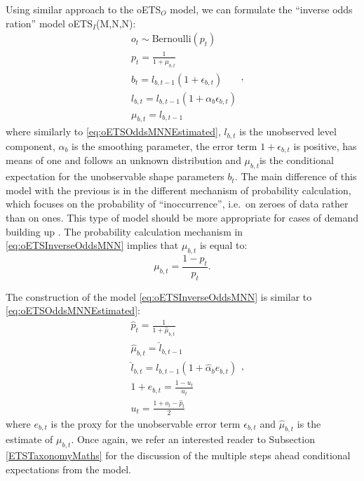 \documentclass[
]{book}
\theoremstyle{definition}
\theoremstyle{definition}
\theoremstyle{definition}
\theoremstyle{definition}
\theoremstyle{remark}
\begin{document}
Using similar approach to the oETS\(_O\) model, we can formulate the ``inverse odds ration'' model oETS\(_I\)(M,N,N):
\begin{equation}
    \begin{aligned}
        & o_t \sim \text{Bernoulli} \left(p_t \right) \\
        & p_t = \frac{1}{1+\mu_{b,t}} \\
        & b_t = l_{b,t-1} \left(1 + \epsilon_{b,t} \right) \\
        & l_{b,t} = l_{b,t-1}( 1  + \alpha_{b} \epsilon_{b,t}) \\
        & \mu_{b,t} = l_{b,t-1}
    \end{aligned},
    \label{eq:oETSInverseOddsMNN}
\end{equation}
where similarly to \eqref{eq:oETSOddsMNNEstimated}, \(l_{b,t}\) is the unobserved level component, \(\alpha_{b}\) is the smoothing parameter, the error term \(1+\epsilon_{b,t}\) is positive, has means of one and follows an unknown distribution and \(\mu_{b,t}\)is the conditional expectation for the unobservable shape parameters \(b_t\). The main difference of this model with the previous is in the different mechanism of probability calculation, which focuses on the probability of ``inoccurrence'', i.e.~on zeroes of data rather than on ones. This type of model should be more appropriate for cases of demand building up \citep{Svetunkov2019a}. The probability calculation mechanism in \eqref{eq:oETSInverseOddsMNN} implies that \(\mu_{b,t}\) is equal to:
\begin{equation}
    \mu_{b,t} = \frac{1-p_t}{p_t} .
\end{equation}

The construction of the model \eqref{eq:oETSInverseOddsMNN} is similar to \eqref{eq:oETSOddsMNNEstimated}:
\begin{equation}
    \begin{aligned}
        & \hat{p}_t = \frac{1}{1+\hat{\mu}_{b,t}} \\
        & \hat{\mu}_{b,t} = \hat{l}_{b,t-1} \\
        & \hat{l}_{b,t} = l_{b,t-1}( 1  + \hat{\alpha}_{b} e_{b,t}) \\
        & 1+e_{b,t} = \frac{1-u_t}{u_t} \\
        & u_{t} = \frac{1 + o_t - \hat{p}_t}{2}
    \end{aligned},
    \label{eq:oETSInverseOddsMNNEstimated}
\end{equation}
where \(e_{b,t}\) is the proxy for the unobservable error term \(\epsilon_{b,t}\) and \(\hat{\mu}_{b,t}\) is the estimate of \(\mu_{b,t}\). Once again, we refer an interested reader to Subsection \ref{ETSTaxonomyMaths} for the discussion of the multiple steps ahead conditional expectations from the model.
\end{document}
